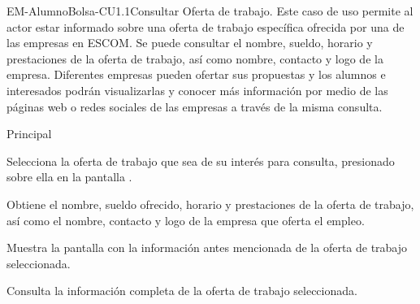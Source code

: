 \begin{UseCase}{EM-AlumnoBolsa-CU1.1}{Consultar Oferta de trabajo.}{
	\noindent
	Este caso de uso permite al actor estar informado sobre una oferta de trabajo específica ofrecida por una de las empresas en ESCOM. Se puede consultar el nombre, sueldo, horario y prestaciones de la oferta de trabajo, así como nombre, contacto y logo de la empresa.
	\newline
	Diferentes empresas pueden ofertar sus propuestas y los alumnos e interesados podrán visualizarlas y conocer más información por medio de las páginas web o redes sociales de las empresas a través de la misma consulta.
	\newline
	}
\end{UseCase}

\begin{UCtrayectoria}{Principal}
	
	\UCpaso [\UCactor] Selecciona la oferta de trabajo que sea de su interés para consulta, presionado sobre ella en la pantalla .

	\UCpaso Obtiene el nombre, sueldo ofrecido, horario y prestaciones de la oferta de trabajo, así como el nombre, contacto y logo de la empresa que oferta el empleo.
	
	\UCpaso Muestra la pantalla  con la información antes mencionada de la oferta de trabajo seleccionada. 
	
	\UCpaso [\UCactor] Consulta la información completa de la oferta de trabajo seleccionada.
\end{UCtrayectoria}


